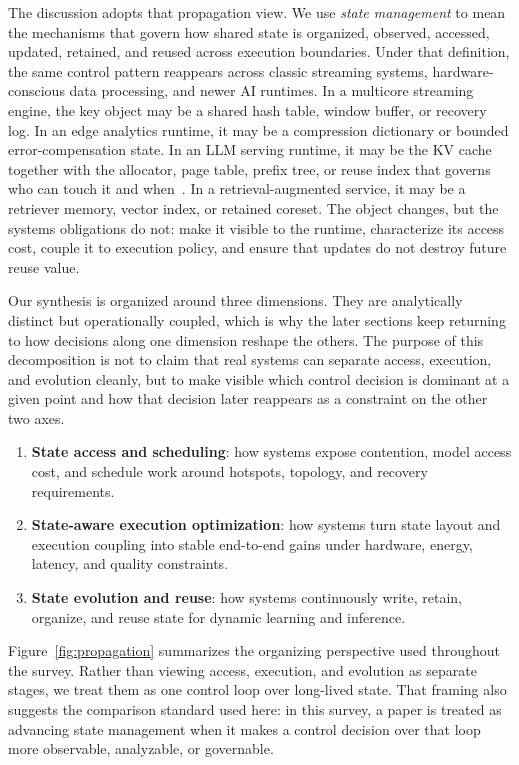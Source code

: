 \documentclass[acmsmall,screen,review]{acmart}
\begin{document}
The discussion adopts that propagation view. We use \emph{state management} to mean the mechanisms that govern how shared state is organized, observed, accessed, updated, retained, and reused across execution boundaries. Under that definition, the same control pattern reappears across classic streaming systems, hardware-conscious data processing, and newer AI runtimes. In a multicore streaming engine, the key object may be a shared hash table, window buffer, or recovery log. In an edge analytics runtime, it may be a compression dictionary or bounded error-compensation state. In an LLM serving runtime, it may be the KV cache together with the allocator, page table, prefix tree, or reuse index that governs who can touch it and when~\cite{kwon2023pagedattention,zheng2023sglang}. In a retrieval-augmented service, it may be a retriever memory, vector index, or retained coreset. The object changes, but the systems obligations do not: make it visible to the runtime, characterize its access cost, couple it to execution policy, and ensure that updates do not destroy future reuse value.

Our synthesis is organized around three dimensions. They are analytically distinct but operationally coupled, which is why the later sections keep returning to how decisions along one dimension reshape the others. The purpose of this decomposition is not to claim that real systems can separate access, execution, and evolution cleanly, but to make visible which control decision is dominant at a given point and how that decision later reappears as a constraint on the other two axes.

\begin{enumerate}[leftmargin=*]
\item \textbf{State access and scheduling}: how systems expose contention, model access cost, and schedule work around hotspots, topology, and recovery requirements.
\item \textbf{State-aware execution optimization}: how systems turn state layout and execution coupling into stable end-to-end gains under hardware, energy, latency, and quality constraints.
\item \textbf{State evolution and reuse}: how systems continuously write, retain, organize, and reuse state for dynamic learning and inference.
\end{enumerate}

Figure~\ref{fig:propagation} summarizes the organizing perspective used throughout the survey. Rather than viewing access, execution, and evolution as separate stages, we treat them as one control loop over long-lived state. That framing also suggests the comparison standard used here: in this survey, a paper is treated as advancing state management when it makes a control decision over that loop more observable, analyzable, or governable.
\end{document}
